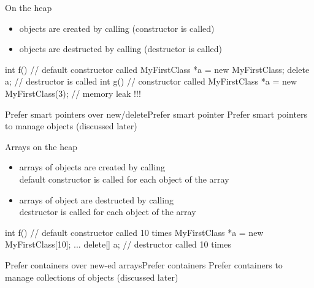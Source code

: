 \begin{frame}[fragile]
  \begin{block}{On the heap}
    \begin{itemize}
    \item objects are created by calling  (constructor is called)
    \item objects are destructed by calling  (destructor is called)
    \end{itemize}
  \end{block}
  \begin{cppcode}
    int f() {
      // default constructor called
      MyFirstClass *a = new MyFirstClass;
      delete a; // destructor is called
    }
    int g() {
      // constructor called
      MyFirstClass *a = new MyFirstClass(3);
    } // memory leak !!!
  \end{cppcode}
  \begin{goodpracticeWithShortcut}{Prefer smart pointers over new/delete}{Prefer smart pointer}
    Prefer smart pointers to manage objects (discussed later)
  \end{goodpracticeWithShortcut}
\end{frame}

\begin{frame}[fragile]
  \begin{block}{Arrays on the heap}
    \begin{itemize}
    \item arrays of objects are created by calling  \\
      default constructor is called for each object of the array
    \item arrays of object are destructed by calling  \\
      destructor is called for each object of the array
    \end{itemize}
  \end{block}
  \begin{cppcode}
    int f() {
      // default constructor called 10 times
      MyFirstClass *a = new MyFirstClass[10];
      ...
      delete[] a; // destructor called 10 times
    }
  \end{cppcode}
  \begin{goodpracticeWithShortcut}{Prefer containers over new-ed arrays}{Prefer containers}
    Prefer containers to manage collections of objects (discussed later)
  \end{goodpracticeWithShortcut}
\end{frame}
